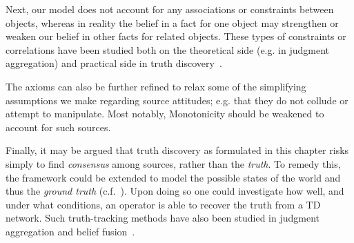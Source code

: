 Next, our model does not account for any associations or constraints between
objects, whereas in reality the belief in a fact for one object may strengthen
or weaken our belief in other facts for related objects. These types of
constraints or correlations have been studied both on the theoretical side
(e.g. in judgment aggregation) and practical side in truth
discovery~\cite{yang_probabilistic_2019}.

The axioms can also be further refined to relax some of the simplifying
assumptions we make regarding source attitudes; e.g. that they do not collude
or attempt to manipulate. Most notably, Monotonicity should be weakened to
account for such sources.

Finally, it may be argued that truth discovery as formulated in this chapter
risks simply to find \emph{consensus} among sources, rather than the
\emph{truth}. To remedy this, the framework could be extended to model the
possible states of the world and thus the \emph{ground truth}
(c.f.~\cite{meir_proxy_2019}). Upon doing so one could investigate how well,
and under what conditions, an operator is able to recover the truth from a TD
network. Such truth-tracking methods have also been studied in judgment
aggregation and belief
fusion~\cite{everaere_epistemic_2010,hartmann_judgment_2012}.
